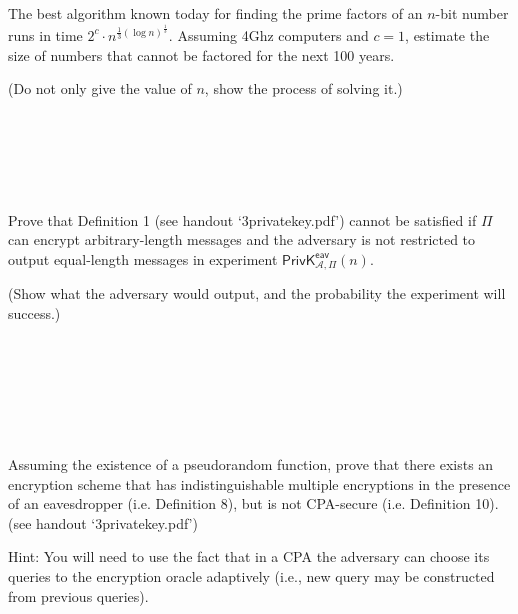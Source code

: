 \documentclass[12pt,letterpaper,boxed]{amspset}
\begin{document}
\begin{problem}[3.1]
The best algorithm known today for finding the prime factors of an $n$-bit number runs in time $2^c\cdot n ^ {\frac{1}{3}(\log n)^{\frac{1}{3}}}$. Assuming 4Ghz computers and $c=1$, estimate the size of numbers that cannot be factored for the next 100 years.
\end{problem}

\begin{solution}
(Do not only give the value of $n$, show the process of solving it.)\\
\\
\\
\\
\\
\\
\end{solution}

\begin{problem}[3.2]
Prove that Definition 1 (see handout `3privatekey.pdf') cannot be satisfied if $\Pi$ can encrypt arbitrary-length messages and the adversary is not restricted to output equal-length messages in experiment $\mathsf{PrivK}^{\mathsf{eav}}_{\mathcal{A},\Pi}(n)$.
\end{problem}

\begin{solution}
(Show what the adversary would output, and the probability the experiment will success.)
\\
\\
\\
\\
\\
\\
\\
\end{solution}

\begin{problem}[3.3]
Assuming the existence of a pseudorandom function, prove that there exists an encryption scheme that has indistinguishable multiple encryptions in the presence of an eavesdropper (i.e. Definition 8), but is not CPA-secure (i.e. Definition 10). (see handout `3privatekey.pdf')
\end{problem}

\begin{solution}
{\small Hint: You will need to use the fact that in a CPA the adversary can choose its queries to the encryption oracle adaptively (i.e., new query may be constructed from previous queries).}\\
\\
\\
\\
\\
\\
\\
\\
\\
\end{solution}
\end{document}
